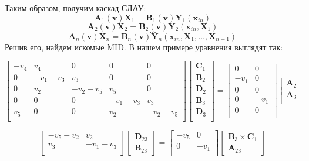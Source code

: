 \documentclass[14pt, a4paper]{extreport}
\begin{document}
Таким образом, получим каскад СЛАУ:
$$\mathbf{A}_1(\mathbf{v})\mathbf{X}_1 = \mathbf{B}_1(\mathbf{v})\mathbf{Y}_1(\mathbf{x}_{in})$$
$$\mathbf{A}_2(\mathbf{v})\mathbf{X}_2 = \mathbf{B}_2(\mathbf{v})\mathbf{Y}_2(\mathbf{x}_{in}, \mathbf{X}_1)$$
$$\dots$$
$$\mathbf{A}_n(\mathbf{v})\mathbf{X}_n = \mathbf{B}_n(\mathbf{v})\mathbf{Y}_n(\mathbf{x}_{in}, \mathbf{X}_1, \ldots, \mathbf{X}_{n - 1})$$
Решив его, найдем искомые MID. В нашем примере уравнения выглядят так:

$$\begin{bmatrix}
-v_4 & v_4 & 0 & 0 & 0\\
0 & -v_1-v_3 & v_3 & 0 & 0\\
0 & v_2 & -v_2-v_5 & v_5 & 0\\
0 & 0 & 0 & -v_1-v_3 & v_3 \\
v_5 & 0 & 0 & v_2 & -v_2-v_5\\
\end{bmatrix}
\begin{bmatrix}
	\mathbf{C}_1\\
	\mathbf{B}_2\\
	\mathbf{D}_2\\
	\mathbf{B}_3\\
	\mathbf{D}_3\\
\end{bmatrix}
=
\begin{bmatrix}
	0 & 0\\
	-v_1 & 0\\
	0 & 0\\
	0 & -v_1\\
	0 & 0\\
\end{bmatrix}
\begin{bmatrix}
	\mathbf{A}_2\\
	\mathbf{A}_3\\
\end{bmatrix}$$

$$\begin{bmatrix}
-v_5-v_2 & v_2\\
v_3 & -v_1-v_3\\
\end{bmatrix}
\begin{bmatrix}
\mathbf{D}_{23}\\
\mathbf{B}_{23}
\end{bmatrix}
=
\begin{bmatrix}
-v_5 & 0\\
0 & -v_1\\
\end{bmatrix}
\begin{bmatrix}
\mathbf{B}_3 \times \mathbf{C}_1\\
\mathbf{A}_{23}
\end{bmatrix}$$
\end{document}
